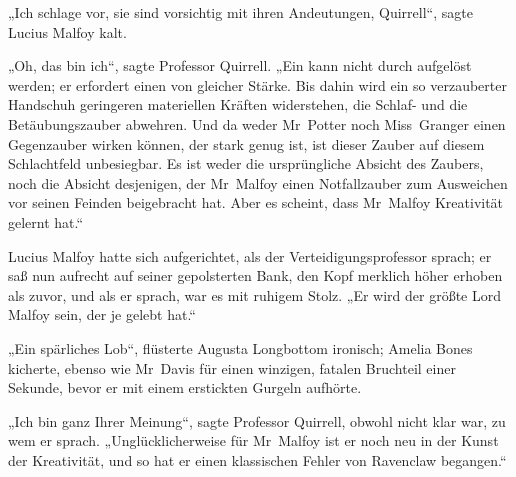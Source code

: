 „Ich schlage vor, sie sind vorsichtig mit ihren Andeutungen, Quirrell“, sagte Lucius Malfoy kalt.

„Oh, das bin ich“, sagte Professor Quirrell.
„Ein  kann nicht durch  aufgelöst werden; er erfordert einen  von gleicher Stärke. Bis dahin wird ein so verzauberter Handschuh geringeren materiellen Kräften widerstehen, die Schlaf- und die Betäubungszauber abwehren. Und da weder Mr~Potter noch Miss~Granger einen Gegenzauber wirken können, der stark genug ist, ist dieser Zauber auf diesem Schlachtfeld unbesiegbar. Es ist weder die ursprüngliche Absicht des Zaubers, noch die Absicht desjenigen, der Mr~Malfoy einen Notfallzauber zum Ausweichen vor seinen Feinden beigebracht hat. Aber es scheint, dass Mr~Malfoy Kreativität gelernt hat.“

Lucius Malfoy hatte sich aufgerichtet, als der Verteidigungsprofessor sprach; er saß nun aufrecht auf seiner gepolsterten Bank, den Kopf merklich höher erhoben als zuvor, und als er sprach, war es mit ruhigem Stolz.
„Er wird der größte Lord Malfoy sein, der je gelebt hat.“

„Ein spärliches Lob“, flüsterte Augusta Longbottom ironisch; Amelia Bones kicherte, ebenso wie Mr~Davis für einen winzigen, fatalen Bruchteil einer Sekunde, bevor er mit einem erstickten Gurgeln aufhörte.

„Ich bin ganz Ihrer Meinung“, sagte Professor Quirrell, obwohl nicht klar war, zu wem er sprach.
„Unglücklicherweise für Mr~Malfoy ist er noch neu in der Kunst der Kreativität, und so hat er einen klassischen Fehler von Ravenclaw begangen.“

